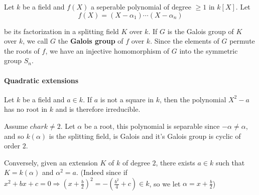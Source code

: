   \begin{definition}
    Let $k$ be a field and $f(X)$ a seperable polynomial of degree $\geq 1$ in $k[X]$. Let \[
    f(X) = (X-\alpha_1)\cdots (X-\alpha_n)  
\]

    be its factorization in a splitting field $K$ over $k$. If $G$ is the Galois group of $K$ over $k$, we call $G$ the \textbf{Galois group} of $f$ over $k$. 
    Since the elements of $G$ permute the roots of $f$, we have an injective homomorphism of $G$ into the symmetric group $S_n$. 
  \end{definition}
  \paragraph*{Quadratic extensions}
  \begin{example}
    Let $k$ be a field and $a\in k$. If $a$ is not a square in $k$, then the polynomial $X^2-a$ has no root in $k$ and is therefore irreducible.
  
    Assume $char k\neq 2$. Let $\alpha$ be a root, this polynomial is separable since $-\alpha\neq \alpha$, and so $k(\alpha)$ is the splitting field, is Galois and it's Galois group is cyclic of order $2$.
  
    Conversely, given an extension $K$ of $k$ of degree $2$, there exists $a\in k$ such that $K = k(\alpha)$ and $\alpha^2 = a$. (Indeed since if $x^2 + bx + c = 0\Rightarrow {(x + \frac{b}{2})}^2 = -(\frac{b^2}{4} + c)\in k$, so we let $\alpha = x + \frac{b}{2}$)
  \end{example}


